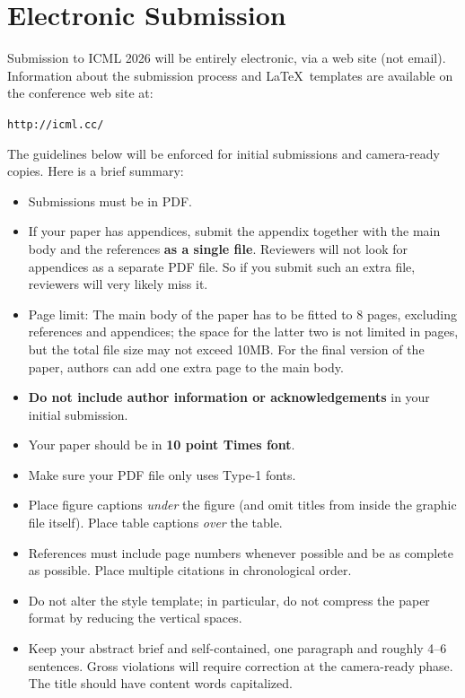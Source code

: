 \documentclass{article}
\theoremstyle{plain}
\theoremstyle{definition}
\theoremstyle{remark}
\begin{document}
\section{Electronic Submission}

Submission to ICML 2026 will be entirely electronic, via a web site
(not email). Information about the submission process and \LaTeX\ templates
are available on the conference web site at:
\begin{center}
  \texttt{http://icml.cc/}
\end{center}

The guidelines below will be enforced for initial submissions and
camera-ready copies. Here is a brief summary:
\begin{itemize}
  \item Submissions must be in PDF\@.
  \item If your paper has appendices, submit the appendix together with the
        main body and the references \textbf{as a single file}. Reviewers will not
        look for appendices as a separate PDF file. So if you submit such an extra
        file, reviewers will very likely miss it.
  \item Page limit: The main body of the paper has to be fitted to 8 pages,
        excluding references and appendices; the space for the latter two is not
        limited in pages, but the total file size may not exceed 10MB. For the
        final version of the paper, authors can add one extra page to the main
        body.
  \item \textbf{Do not include author information or acknowledgements} in your
        initial submission.
  \item Your paper should be in \textbf{10 point Times font}.
  \item Make sure your PDF file only uses Type-1 fonts.
  \item Place figure captions \emph{under} the figure (and omit titles from
        inside the graphic file itself). Place table captions \emph{over} the
        table.
  \item References must include page numbers whenever possible and be as
        complete as possible. Place multiple citations in chronological order.
  \item Do not alter the style template; in particular, do not compress the
        paper format by reducing the vertical spaces.
  \item Keep your abstract brief and self-contained, one paragraph and roughly
        4--6 sentences. Gross violations will require correction at the
        camera-ready phase. The title should have content words capitalized.
\end{itemize}
\end{document}

